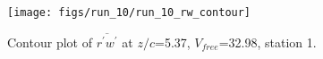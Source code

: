 \begin{figure}[H]
\centering
\texttt{[image: figs/run\_10/run\_10\_rw\_contour]}
\caption{Contour plot of $\overline{r^\prime w^\prime}$ at $z/c$=5.37, $V_{free}$=32.98, station 1.}
\label{fig:run_10_rw_contour}
\end{figure}


